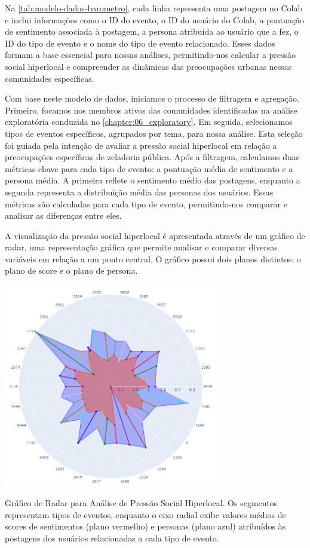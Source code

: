 Na \autoref{tab:modelo-dados-barometro}, cada linha representa uma postagem no Colab e inclui informações como o ID do evento, o ID do usuário do Colab, a pontuação de sentimento associada à postagem, a persona atribuída ao usuário que a fez, o ID do tipo de evento e o nome do tipo de evento relacionado. Esses dados formam a base essencial para nossas análises, permitindo-nos calcular a pressão social hiperlocal e compreender as dinâmicas das preocupações urbanas nessas comunidades específicas.

Com base neste modelo de dados, iniciamos o processo de filtragem e agregação. Primeiro, focamos nos membros ativos das comunidades identificadas na análise exploratória conduzida no \autoref{chapter:06_exploratory}. Em seguida, selecionamos tipos de eventos específicos, agrupados por tema, para nossa análise. Esta seleção foi guiada pela intenção de avaliar a pressão social hiperlocal em relação a preocupações específicas de zeladoria pública. Após a filtragem, calculamos duas métricas-chave para cada tipo de evento: a pontuação média de sentimento e a persona média. A primeira reflete o sentimento médio das postagens, enquanto a segunda representa a distribuição média das personas dos usuários. Essas métricas são calculadas para cada tipo de evento, permitindo-nos comparar e analisar as diferenças entre eles.

A visualização da pressão social hiperlocal é apresentada através de um gráfico de radar, uma representação gráfica que permite analisar e comparar diversas variáveis em relação a um ponto central. O gráfico possui dois planos distintos: o plano de score e o plano de persona.

\begin{quadro}[htb]
	\centering
	\includegraphics[width=0.7\textwidth]{images/social_barometer_plot.png}
	\caption{Gráfico de Radar para Análise de Pressão Social Hiperlocal. Os segmentos representam tipos de eventos, enquanto o eixo radial exibe valores médios de scores de sentimentos (plano vermelho) e personas (plano azul) atribuídos às postagens dos usuários relacionadas a cada tipo de evento.}
	\label{fig:social_barometer_plot}
\end{quadro}

